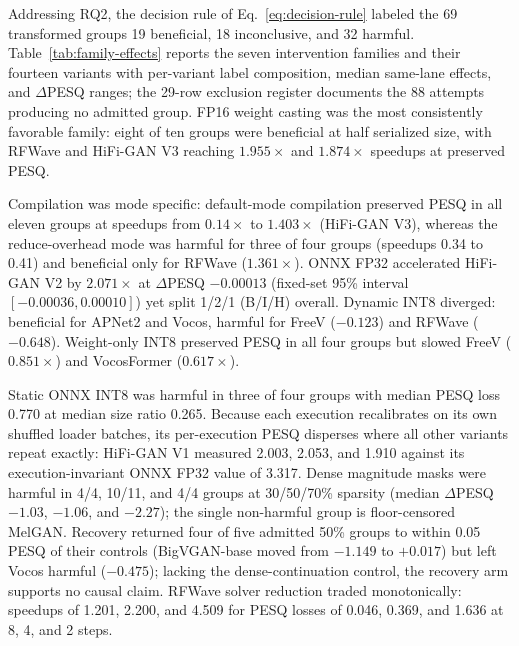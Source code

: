 Addressing RQ2, the decision rule of Eq.~\eqref{eq:decision-rule} labeled
the 69 transformed groups 19 beneficial, 18 inconclusive, and 32 harmful.
Table~\ref{tab:family-effects} reports the seven intervention families and
their fourteen variants with per-variant label composition, median
same-lane effects, and $\Delta$PESQ ranges; the 29-row exclusion
register documents the 88 attempts producing no admitted group.  FP16
weight casting was the most consistently favorable family: eight of
ten groups were beneficial at half serialized size, with RFWave and
HiFi-GAN V3 reaching $1.955\times$ and $1.874\times$ speedups at preserved
PESQ.

\begin{table}[t]
  \centering
  \footnotesize
  \renewcommand{\arraystretch}{1.02}
  \caption{Deployment intervention outcomes over the 69 admitted groups,
  by family and variant: admitted count, beneficial/inconclusive/harmful
  composition under Eq.~\eqref{eq:decision-rule}, median same-lane
  $\Delta$PESQ, speedup $S_a$, and size ratio $Z_a$
  (Eq.~\eqref{eq:deployment-effects}), and the $\Delta$PESQ range across
  the variant's admitted groups; single-group variants report their one
  contrast.}
  \label{tab:family-effects}
\end{table}

Compilation was mode specific: default-mode compilation preserved PESQ in
all eleven groups at speedups from $0.14\times$ to $1.403\times$
(HiFi-GAN V3), whereas the reduce-overhead mode was harmful for three of
four groups (speedups 0.34 to 0.41) and beneficial only for RFWave
($1.361\times$).  ONNX FP32
accelerated HiFi-GAN V2 by $2.071\times$ at $\Delta$PESQ $-0.00013$
(fixed-set 95\% interval $[-0.00036, 0.00010]$) yet split 1/2/1 (B/I/H)
overall.  Dynamic INT8 diverged: beneficial for APNet2 and
Vocos, harmful for FreeV ($-0.123$) and RFWave ($-0.648$).  Weight-only
INT8 preserved PESQ in all four groups but slowed FreeV ($0.851\times$) and
VocosFormer ($0.617\times$).

Static ONNX INT8 was harmful in three of four groups with median PESQ loss
0.770 at median size ratio 0.265.  Because each execution recalibrates on
its own shuffled loader batches, its per-execution PESQ disperses where all
other variants repeat exactly: HiFi-GAN V1 measured 2.003, 2.053, and
1.910 against its execution-invariant ONNX FP32 value of 3.317.  Dense magnitude
masks were harmful in 4/4, 10/11, and 4/4 groups at 30/50/70\% sparsity
(median $\Delta$PESQ $-1.03$, $-1.06$, and $-2.27$); the single non-harmful
group is floor-censored MelGAN.  Recovery returned four of five admitted
50\% groups to within 0.05 PESQ of their controls (BigVGAN-base moved
from $-1.149$ to $+0.017$) but left Vocos harmful ($-0.475$); lacking
the dense-continuation control, the recovery arm supports no causal claim.  RFWave
solver reduction traded monotonically: speedups of 1.201, 2.200, and 4.509
for PESQ losses of 0.046, 0.369, and 1.636 at 8, 4, and 2 steps.

